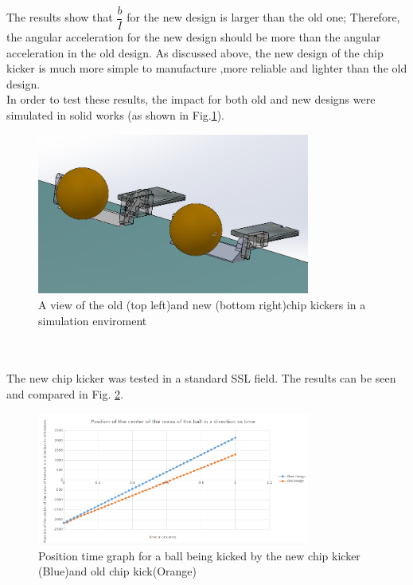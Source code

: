 The results show that $\dfrac{b}{I}$ for the new design is larger than the old one; Therefore, the angular acceleration for the new design should be more than the angular acceleration in the old design. As discussed above, the new design of the chip kicker is much more simple to manufacture ,more reliable and lighter than the old design. %
\\
In order to test these results, the impact for both old and new designs were simulated in solid works (as shown in Fig.\ref{fig:SIM2CHIP}).\\
\begin{figure}
	\centering
	\includegraphics[width=0.8\textwidth]{images/SIM_CHIPx2.png}
	\caption{A view of the old (top left)and new (bottom right)chip kickers in a simulation enviroment}
	\label{fig:SIM2CHIP}
\end{figure}\\
\\
The new chip kicker was tested in a standard SSL field. The results can be seen and compared in Fig. \ref{fig:NEWOLDPLOTBALL}.\\
\begin{figure}
	\centering
	\includegraphics[width=0.8\textwidth]{images/CHIP_POS_PLOT.png}
	\caption{Position time graph for a ball being kicked by the new chip kicker (Blue)and old chip kick(Orange)}
	\label{fig:NEWOLDPLOTBALL}
\end{figure}
